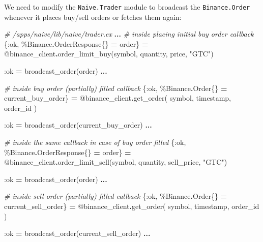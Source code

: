 \documentclass[
  oneside]{book}
\newenvironment{Shaded}{\begin{snugshade}}{\end{snugshade}}
\newcommand{\CommentTok}[1]{\textcolor[rgb]{0.56,0.35,0.01}{\textit{#1}}}
\newcommand{\ConstantTok}[1]{\textcolor[rgb]{0.00,0.00,0.00}{#1}}
\newcommand{\NormalTok}[1]{#1}
\newcommand{\OperatorTok}[1]{\textcolor[rgb]{0.81,0.36,0.00}{\textbf{#1}}}
\newcommand{\OtherTok}[1]{\textcolor[rgb]{0.56,0.35,0.01}{#1}}
\newcommand{\StringTok}[1]{\textcolor[rgb]{0.31,0.60,0.02}{#1}}
\newcommand{\VariableTok}[1]{\textcolor[rgb]{0.00,0.00,0.00}{#1}}
\begin{document}
We need to modify the \texttt{Naive.Trader} module to broadcast the \texttt{Binance.Order} whenever it places buy/sell orders or fetches them again:

\begin{Shaded}
\begin{Highlighting}[]
    \CommentTok{\# /apps/naive/lib/naive/trader.ex}
    \OperatorTok{...}
    \CommentTok{\# inside placing initial buy order callback}
\NormalTok{    \{}\VariableTok{:ok}\NormalTok{, \%}\ConstantTok{Binance}\OperatorTok{.}\ConstantTok{OrderResponse}\NormalTok{\{\} }\OperatorTok{=}\NormalTok{ order\} }\OperatorTok{=}
      \OtherTok{@binance\_client}\OperatorTok{.}\NormalTok{order\_limit\_buy(symbol, quantity, price, }\StringTok{"GTC"}\NormalTok{)}

    \VariableTok{:ok} \OperatorTok{=}\NormalTok{ broadcast\_order(order)}
    \OperatorTok{...}

    \CommentTok{\# inside buy order (partially) filled callback}
\NormalTok{    \{}\VariableTok{:ok}\NormalTok{, \%}\ConstantTok{Binance}\OperatorTok{.}\ConstantTok{Order}\NormalTok{\{\} }\OperatorTok{=}\NormalTok{ current\_buy\_order\} }\OperatorTok{=}
      \OtherTok{@binance\_client}\OperatorTok{.}\NormalTok{get\_order(}
\NormalTok{        symbol,}
\NormalTok{        timestamp,}
\NormalTok{        order\_id}
\NormalTok{      )}

    \VariableTok{:ok} \OperatorTok{=}\NormalTok{ broadcast\_order(current\_buy\_order)}
    \OperatorTok{...}

        \CommentTok{\# inside the same callback in case of buy order filled}
\NormalTok{        \{}\VariableTok{:ok}\NormalTok{, \%}\ConstantTok{Binance}\OperatorTok{.}\ConstantTok{OrderResponse}\NormalTok{\{\} }\OperatorTok{=}\NormalTok{ order\} }\OperatorTok{=}
          \OtherTok{@binance\_client}\OperatorTok{.}\NormalTok{order\_limit\_sell(symbol, quantity, sell\_price, }\StringTok{"GTC"}\NormalTok{)}
        
        \VariableTok{:ok} \OperatorTok{=}\NormalTok{ broadcast\_order(order)}
    \OperatorTok{...}

    \CommentTok{\# inside sell order (partially) filled callback}
\NormalTok{    \{}\VariableTok{:ok}\NormalTok{, \%}\ConstantTok{Binance}\OperatorTok{.}\ConstantTok{Order}\NormalTok{\{\} }\OperatorTok{=}\NormalTok{ current\_sell\_order\} }\OperatorTok{=}
      \OtherTok{@binance\_client}\OperatorTok{.}\NormalTok{get\_order(}
\NormalTok{        symbol,}
\NormalTok{        timestamp,}
\NormalTok{        order\_id}
\NormalTok{      )}
    
    \VariableTok{:ok} \OperatorTok{=}\NormalTok{ broadcast\_order(current\_sell\_order)}
    \OperatorTok{...}
\end{Highlighting}
\end{Shaded}
\end{document}
